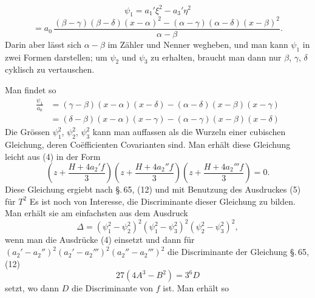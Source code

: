 \[
\psi_1 = a_1'\xi^2 - a_3'\eta^2
\]
\[
= a_0\,\frac{(\beta-\gamma)(\beta-\delta)(x-\alpha)^2 - (\alpha-\gamma)(\alpha-\delta)(x-\beta)^2}{\alpha-\beta}.
\]
Darin aber lässt sich $\alpha - \beta$ im Zähler und Nenner wegheben, und man kann
$\psi_1$ in zwei Formen darstellen; um $\psi_2$ und $\psi_3$ zu erhalten, braucht man
dann nur $\beta$, $\gamma$, $\delta$ cyklisch zu vertauschen.

Man findet so
\[
\begin{aligned}
\frac{\psi_1}{a_0} &= (\gamma-\beta)(x-\alpha)(x-\delta) - (\alpha-\delta)(x-\beta)(x-\gamma) \\
&= (\delta-\beta)(x-\alpha)(x-\gamma) - (\alpha-\gamma)(x-\beta)(x-\delta)
\end{aligned}
\]
Die Grössen $\psi_1^2$, $\psi_2^2$, $\psi_3^2$ kann man auffassen als die Wurzeln
einer cubischen Gleichung, deren Co\"efficienten Covarianten sind. Man erhält
diese Gleichung leicht aus (4) in der Form
\[
\left(z + \frac{H+4a_2'f}{3}\right)\left(z + \frac{H+4a_2''f}{3}\right)\left(z + \frac{H+4a_2'''f}{3}\right) = 0.
\]
Diese Gleichung ergiebt nach \S.\,65, (12) und mit Benutzung des Ausdruckes (5)
für $T^2$
Es ist noch von Interesse, die Discriminante dieser Gleichung zu bilden. Man
erhält sie am einfachsten aus dem Ausdruck
\[
\varDelta = (\psi_1^2 - \psi_2^2)^2(\psi_1^2 - \psi_3^2)^2(\psi_2^2 - \psi_3^2)^2,
\]
wenn man die Ausdrücke (4) einsetzt und dann für $(a_2'-a_2'')^2(a_2'-a_2''')^2(a_2''-a_2''')^2$
die Discriminante der Gleichung \S.\,65, (12)
\[
27(4A^3 - B^2) = 3^6 D
\]
setzt, wo dann $D$ die Discriminante von $f$ ist. Man erhält so

